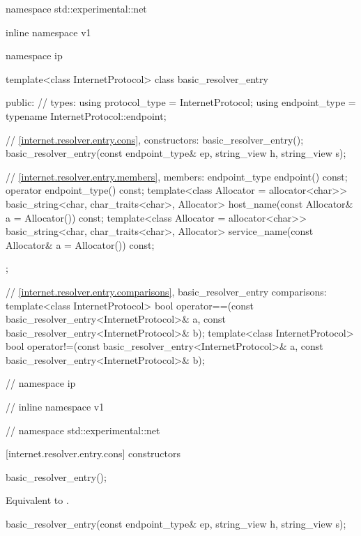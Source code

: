 \begin{codeblock}
namespace std::experimental::net {
inline namespace v1 {
namespace ip {

  template<class InternetProtocol>
  class basic_resolver_entry
  {
  public:
    // types:
    using protocol_type = InternetProtocol;
    using endpoint_type = typename InternetProtocol::endpoint;

    // \ref{internet.resolver.entry.cons}, constructors:
    basic_resolver_entry();
    basic_resolver_entry(const endpoint_type& ep,
                         string_view h,
                         string_view s);

    // \ref{internet.resolver.entry.members}, members:
    endpoint_type endpoint() const;
    operator endpoint_type() const;
    template<class Allocator = allocator<char>>
      basic_string<char, char_traits<char>, Allocator>
        host_name(const Allocator& a = Allocator()) const;
    template<class Allocator = allocator<char>>
      basic_string<char, char_traits<char>, Allocator>
        service_name(const Allocator& a = Allocator()) const;
  };

  // \ref{internet.resolver.entry.comparisons}, basic_resolver_entry comparisons:
  template<class InternetProtocol>
    bool operator==(const basic_resolver_entry<InternetProtocol>& a,
                    const basic_resolver_entry<InternetProtocol>& b);
  template<class InternetProtocol>
    bool operator!=(const basic_resolver_entry<InternetProtocol>& a,
                    const basic_resolver_entry<InternetProtocol>& b);

} // namespace ip
} // inline namespace v1
} // namespace std::experimental::net
\end{codeblock}


[internet.resolver.entry.cons]{ constructors}

\begin{itemdecl}
basic_resolver_entry();
\end{itemdecl}

\begin{itemdescr}
\pnum
\effects Equivalent to .
\end{itemdescr}

\begin{itemdecl}
basic_resolver_entry(const endpoint_type& ep,
                     string_view h,
                     string_view s);
\end{itemdecl}

